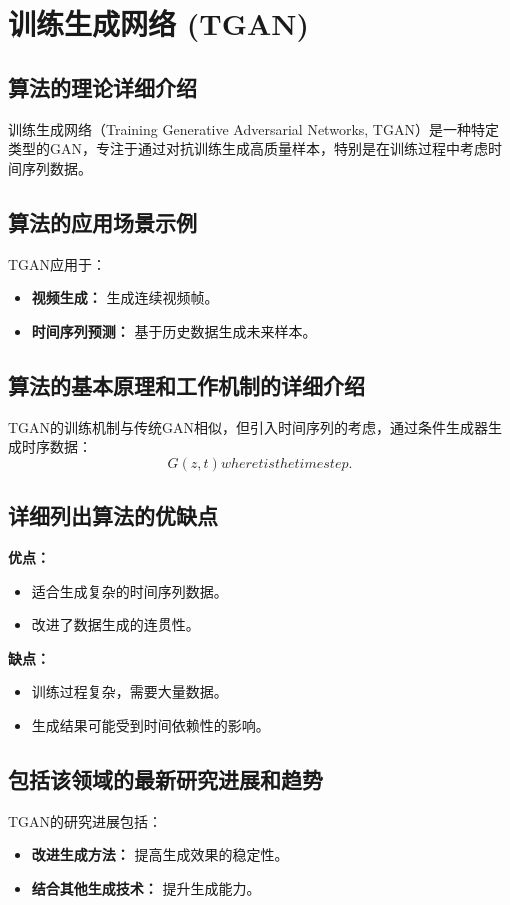 \section{训练生成网络 (TGAN)}
\subsection*{算法的理论详细介绍}
训练生成网络（Training Generative Adversarial Networks, TGAN）是一种特定类型的GAN，专注于通过对抗训练生成高质量样本，特别是在训练过程中考虑时间序列数据。

\subsection*{算法的应用场景示例}
TGAN应用于：
\begin{itemize}
    \item \textbf{视频生成：} 生成连续视频帧。
    \item \textbf{时间序列预测：} 基于历史数据生成未来样本。
\end{itemize}

\subsection*{算法的基本原理和工作机制的详细介绍}
TGAN的训练机制与传统GAN相似，但引入时间序列的考虑，通过条件生成器生成时序数据：
\[
    G(z, t)  where  t  is the time step.
\]

\subsection*{详细列出算法的优缺点}
\textbf{优点：}
\begin{itemize}
    \item 适合生成复杂的时间序列数据。
    \item 改进了数据生成的连贯性。
\end{itemize}

\textbf{缺点：}
\begin{itemize}
    \item 训练过程复杂，需要大量数据。
    \item 生成结果可能受到时间依赖性的影响。
\end{itemize}

\subsection*{包括该领域的最新研究进展和趋势}
TGAN的研究进展包括：
\begin{itemize}
    \item \textbf{改进生成方法：} 提高生成效果的稳定性。
    \item \textbf{结合其他生成技术：} 提升生成能力。
\end{itemize}

